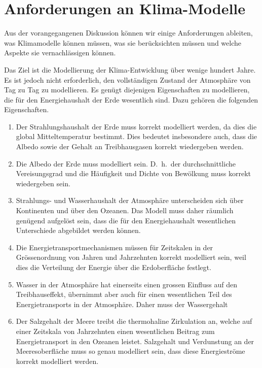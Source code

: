 %
%
%

\section{Anforderungen an Klima-Modelle\label{section:anforderungen}}
Aus der vorangegangenen Diskussion können wir einige Anforderungen
ableiten, was Klimamodelle können müssen, was sie berücksichten
müssen und welche Aspekte sie vernachlässigen können.

Das Ziel ist die Modellierung der Klima-Entwicklung über wenige
hundert Jahre.
Es ist jedoch nicht erforderlich, den vollständigen Zustand der
Atmosphäre von Tag zu Tag zu modellieren.
Es genügt diejenigen Eigenschaften zu modellieren, die 
für den Energiehaushalt der Erde wesentlich sind.
Dazu gehören die folgenden Eigenschaften.
\begin{enumerate}
\item
Der Strahlungshaushalt der Erde muss korrekt modelliert werden,
da dies die global Mitteltemperatur bestimmt.
Dies bedeutet insbesondere auch, dass die Albedo sowie der Gehalt an
Treibhausgasen korrekt wiedergeben werden.
\item
Die Albedo der Erde muss modelliert sein. 
D.~h.~der durchschnittliche Vereisungsgrad und die Häufigkeit und
Dichte von Bewölkung muss korrekt wiedergeben sein.
\item
Strahlungs- und Wasserhaushalt der Atmosphäre unterscheiden sich
über Kontinenten und über den Ozeanen.
Das Modell muss daher räumlich genügend aufgelöst sein, dass die
für den Energiehaushalt wesentlichen Unterschiede abgebildet
werden können.
\item
Die Energietransportmechanismen müssen für Zeitskalen in der Grössenordnung
von Jahren und Jahrzehnten korrekt modelliert sein, weil dies die
Verteilung der Energie über die Erdoberfläche festlegt.
\item
Wasser in der Atmosphäre hat einerseits einen grossen Einfluss auf
den Treibhauseffekt, übernimmt aber auch für einen wesentlichen Teil
des Energietransports in der Atmosphäre.
Daher muss der Wassergehalt 
\item
Der Salzgehalt der Meere treibt die thermohaline Zirkulation an, welche
auf einer Zeitskala von Jahrzehnten einen wesentlichen Beitrag zum
Energietransport in den Ozeanen leistet.
Salzgehalt und Verdunstung an der Meeresoberfläche muss so genau
modelliert sein, dass diese Energieströme korrekt modelliert werden.
\end{enumerate}

